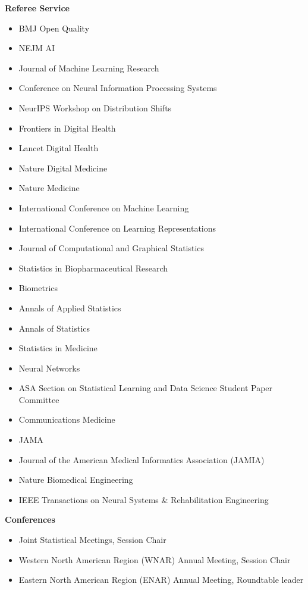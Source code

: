 \documentclass[11pt,a4paper,sans]{moderncv}        %
\begin{document}
\textbf{Referee Service}
\begin{itemize}
	\item BMJ Open Quality  %
	\item NEJM AI %
	\item Journal of Machine Learning Research %
	\item Conference on Neural Information Processing Systems %
	\item NeurIPS Workshop on Distribution Shifts %
	\item Frontiers in Digital Health %
	\item Lancet Digital Health %
	\item Nature Digital Medicine %
	\item Nature Medicine %
        \item International Conference on Machine Learning %
        \item International Conference on Learning Representations %
	\item Journal of Computational and Graphical Statistics %
	\item Statistics in Biopharmaceutical Research %
	\item Biometrics %
	\item Annals of Applied Statistics %
	\item Annals of Statistics %
	\item Statistics in Medicine %
	\item Neural Networks %
	\item ASA Section on Statistical Learning and Data Science Student Paper Committee %
	\item Communications Medicine %
	\item JAMA
	\item Journal of the American Medical Informatics Association (JAMIA) %
        \item Nature Biomedical Engineering %
        \item IEEE Transactions on Neural Systems \& Rehabilitation Engineering %
\end{itemize}

\textbf{Conferences}
\begin{itemize}
\item Joint Statistical Meetings, Session Chair
\item Western North American Region (WNAR) Annual Meeting, Session Chair
\item Eastern North American Region (ENAR) Annual Meeting, Roundtable leader
\end{itemize}
\end{document}
